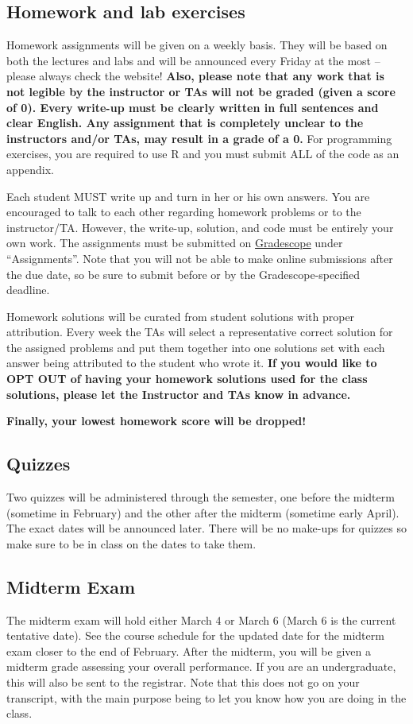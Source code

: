 \documentclass[11pt, a4paper]{article}
\begin{document}
\subsection{Homework and lab exercises}
Homework assignments will be given on a weekly basis. They will be based on both the lectures and labs and will be announced every Friday at the most – please always check the website! \textbf{Also, please note that any work that is not legible by the instructor or TAs will not be graded (given a score  of 0). Every write-up must be clearly written in full sentences and clear English. Any assignment that is completely unclear to the instructors and/or TAs, may result in a grade of a 0.} For programming exercises, you are required to use R and you must submit ALL of the code as an appendix.  

Each student MUST write up and turn in her or his own answers. You are encouraged to talk to each other regarding homework problems or to the instructor/TA. However, the write-up, solution, and code must be entirely your own work. The assignments must be submitted on \href{https://www.gradescope.com/courses/77790/assignments}{Gradescope} under ``Assignments''. Note that you will not be able to make online submissions after the due date, so be sure to submit before or by the Gradescope-specified deadline.

Homework solutions will be curated from student solutions with proper attribution. Every week the TAs will select a representative correct solution for the assigned problems and put them together into one solutions set with each answer being attributed to the student who wrote it. \textbf{If you would like to OPT OUT of having your homework solutions used for the class solutions, please let the Instructor and TAs know in advance.}

\textbf{Finally, your lowest homework score will be dropped!}

\subsection{Quizzes}
Two quizzes will be administered through the semester, one before the midterm (sometime in February) and the other after the midterm (sometime early April). The exact dates will be announced later. There will be no make-ups for quizzes so make sure to be in class on the dates to take them.

\subsection{Midterm Exam}
The midterm exam will hold either March 4 or March 6 (March 6 is the current tentative date). See the course schedule for the updated date for the midterm exam closer to the end of February. After the midterm, you will be given a midterm grade assessing your overall performance. If you are an undergraduate, this will also be sent to the registrar. Note that this does not go on your transcript, with the main purpose being to let you know how you are doing in the class.
\end{document}
